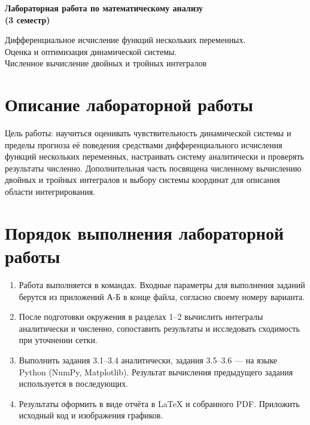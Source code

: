 \documentclass[12pt,a4paper]{article}
\begin{document}
\sloppy
\begin{center}
{\LARGE\bfseries Лабораторная работа по математическому анализу\\(3 семестр)\par}
\vspace{0.4em}
{\large Дифференциальное исчисление функций нескольких переменных.\\
Оценка и оптимизация динамической системы.\\
Численное вычисление двойных и тройных интегралов\par}
\end{center}

\section*{Описание лабораторной работы}
Цель работы: научиться оценивать чувствительность динамической системы и пределы
прогноза её поведения средствами дифференциального исчисления функций нескольких
переменных, настраивать систему аналитически и проверять результаты численно.
Дополнительная часть посвящена численному вычислению двойных и тройных интегралов
и выбору системы координат для описания области интегрирования.

\section*{Порядок выполнения лабораторной работы}
\begin{enumerate}
\item Работа выполняется в командах. Входные параметры для выполнения заданий берутся из приложений А-Б
в конце файла, согласно своему номеру варианта.
\item После подготовки окружения в разделах 1--2 вычислить интегралы
аналитически и численно, сопоставить результаты и исследовать сходимость
при уточнении сетки.
\item Выполнить задания 3.1--3.4 аналитически,
задания 3.5--3.6 --- на языке Python (NumPy, Matplotlib).
Результат вычисления предыдущего задания используется в последующих.
\item Результаты оформить в виде отчёта в LaTeX и собранного PDF.
Приложить исходный код и изображения графиков.
\end{enumerate}
\end{document}

